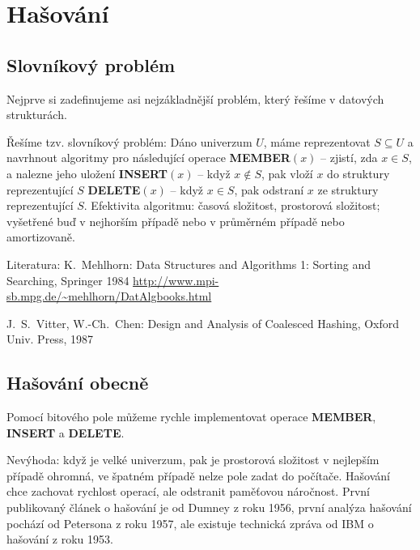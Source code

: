 \documentclass[a4paper,12pt]{article}
\begin{document}
\section{Hašování}


\subsection{Slovníkový problém}

Nejprve si zadefinujeme asi 
nejzákladnější problém, který řešíme v datových strukturách. 

Řešíme tzv. slovníkový problém: Dáno 
univerzum $U$, máme reprezentovat $S\subseteq U$ a navrhnout algoritmy pro 
násle\-dující operace\newline 
{\bf MEMBER$(x)$} -- zjistí, zda $x\in S$, a nalezne jeho 
uložení\newline 
{\bf INSERT$(x)$} -- když $x\notin S$, pak vloží $x$ do struktury 
repre\-zentující $S$\newline 
{\bf DELETE$(x)$} -- když $x\in S$, pak odstraní $x$ ze struktury 
reprezentující $S$.\newline 
Efektivita algoritmu: časová složitost, prostorová 
složitost;\newline 
vy\-šetřené buď v nejhorším případě nebo v 
průměrném případě nebo amortizovaně.

Literatura:\newline 
K.~Mehlhorn: Data Structures and Algorithms 1: Sorting 
and Searching, Springer 1984\newline 
\url{http://www.mpi-sb.mpg.de/~mehlhorn/DatAlgbooks.html}

J.~S.~Vitter, W.-Ch.~Chen: Design and Analysis of 
Coalesced Hashing, Oxford Univ. Press, 1987

\subsection{Hašování obecně}

Pomocí bitového pole můžeme rychle 
implementovat operace {\bf MEMBER}, {\bf INSERT} a {\bf DELETE}. 

Nevýhoda: když je velké univerzum, pak je prostorová 
složitost v nejlepším případě ohrom\-ná, ve špatném 
případě nelze pole zadat do počítače.\newline 
Hašování chce zachovat rychlost operací, ale odstranit 
paměťo\-vou náročnost. První publikovaný článek o 
hašování je od Dumney z roku 1956, první analýza hašování 
pochází od Petersona z roku 1957, ale existuje technická  
zpráva od IBM o hašování z roku 1953.
\end{document}
